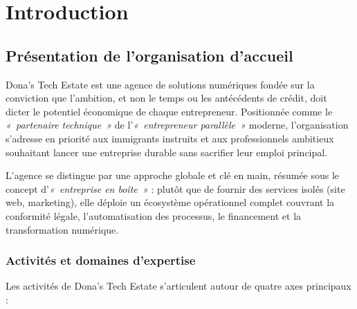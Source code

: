 
\chapter{Introduction}

\section{Présentation de l'organisation d'accueil}

Dona's Tech Estate est une agence de solutions numériques fondée sur la conviction que
l'ambition, et non le temps ou les antécédents de crédit, doit dicter le potentiel économique
de chaque entrepreneur. Positionnée comme le \textit{«~partenaire technique~»} de
l'\textit{«~entrepreneur parallèle~»} moderne, l'organisation s'adresse en priorité aux
immigrants instruits et aux professionnels ambitieux souhaitant lancer une entreprise durable
sans sacrifier leur emploi principal.

L'agence se distingue par une approche globale et clé en main, résumée sous le concept
d'\textit{«~entreprise en boîte~»} : plutôt que de fournir des services isolés (site web,
marketing), elle déploie un écosystème opérationnel complet couvrant la conformité légale,
l'automatisation des processus, le financement et la transformation numérique.

\subsection{Activités et domaines d'expertise}

Les activités de Dona's Tech Estate s'articulent autour de quatre axes principaux :

